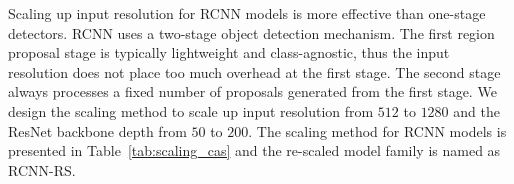\documentclass[final]{cvpr}
\begin{document}
Scaling up input resolution for RCNN models is more effective than one-stage detectors. RCNN uses a two-stage object detection mechanism.
The first region proposal stage is typically lightweight and class-agnostic, thus the input resolution does not place too much overhead at the first stage.
The second stage always processes a fixed number of proposals generated from the first stage. We design the scaling method to scale up input resolution from $512$ to $1280$ and the ResNet backbone depth from $50$ to $200$. The scaling method for RCNN models is presented in Table~\ref{tab:scaling_cas} and the re-scaled model family is named as RCNN-RS.

\newcommand{\light}[1]{\textcolor{gray}{#1}}
\end{document}
